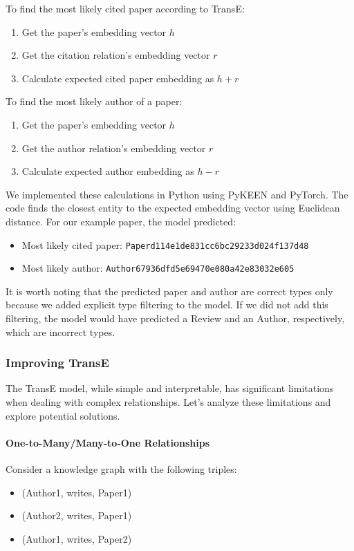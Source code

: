 \documentclass[10pt,a4paper]{article}
\begin{document}
To find the most likely cited paper according to TransE:
\begin{enumerate}
    \item Get the paper's embedding vector $h$
    \item Get the citation relation's embedding vector $r$
    \item Calculate expected cited paper embedding as $h + r$
\end{enumerate}

To find the most likely author of a paper:
\begin{enumerate}
    \item Get the paper's embedding vector $h$
    \item Get the author relation's embedding vector $r$
    \item Calculate expected author embedding as $h - r$
\end{enumerate}

We implemented these calculations in Python using PyKEEN and PyTorch. The code finds the closest entity to the expected embedding vector using Euclidean distance. For our example paper, the model predicted:
\begin{itemize}
    \item Most likely cited paper: \texttt{Paperd114e1de831cc6bc29233d024f137d48}
    \item Most likely author: \texttt{Author67936dfd5e69470e080a42e83032e605}
\end{itemize}

It is worth noting that the predicted paper and author are correct types only because we added explicit type filtering to the model. If we did not add this filtering, the model would have predicted a Review and an Author, respectively, which are incorrect types.

\subsubsection{Improving TransE}

The TransE model, while simple and interpretable, has significant limitations when dealing with complex relationships. Let's analyze these limitations and explore potential solutions.

\paragraph{One-to-Many/Many-to-One Relationships}
Consider a knowledge graph with the following triples:
\begin{itemize}
    \item (Author1, writes, Paper1)
    \item (Author2, writes, Paper1)
    \item (Author1, writes, Paper2)
\end{itemize}
\end{document}
